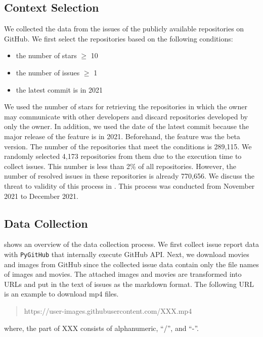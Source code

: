 \subsection{Context Selection}
We collected the data from the issues of 
the publicly available repositories on GitHub. 
We first select the repositories based on the following conditions:
\begin{itemize}
	\item the number of stars $\geq$ 10
	\item the number of issues $\geq$ 1
	\item the latest commit is in 2021
\end{itemize}
We used the number of stars for retrieving the repositories 
in which the owner may communicate with other developers and 
discard repositories developed by only the owner. 
In addition, we used the date of the latest commit 
because the major release of the feature is in 2021. 
Beforehand, the feature was the beta version. 
The number of the repositories that meet 
the conditions is 289,115. 
We randomly selected 4,173 repositories from them 
due to the execution time to collect issues. 
This number is less than 2\% of all repositories. 
However, the number of resolved issues 
in these repositories is already 770,656. 
We discuss the threat to validity of 
this process in . 
This process was conducted from November 2021 to December 2021.



\subsection{Data Collection}
 shows an overview of the data collection process. We first collect issue report data with \texttt{PyGitHub} that internally execute GitHub API. Next, we download movies and images from GitHub since the collected issue data contain only the file names of images and movies. The attached images and movies are transformed into URLs and put in the text of issues as the markdown format. 
The following URL is an example to download mp4 files. 
\begin{quote}
	https://user-images.githubusercontent.com/XXX.mp4
	\\
\end{quote}

\noindent{}
where, the part of XXX consists of alphanumeric, ``/'', and ``-''.

